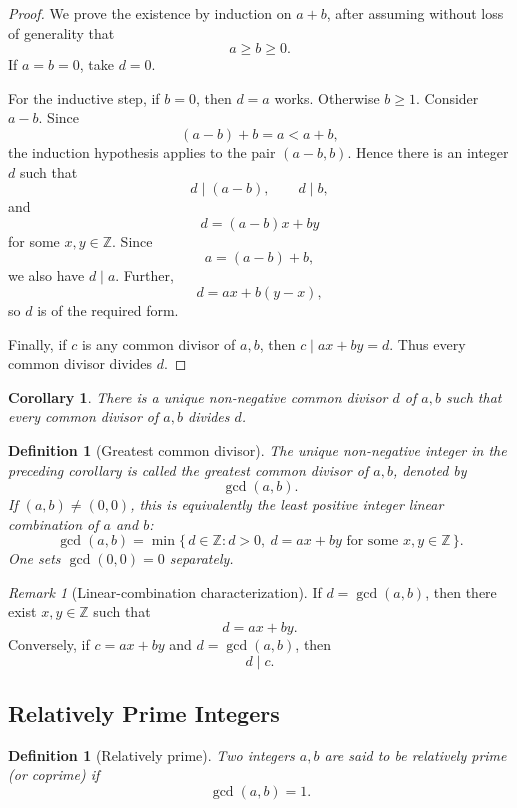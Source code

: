 \documentclass[11pt]{article}
\newtheorem{corollary}[theorem]{Corollary}
\newtheorem{definition}[theorem]{Definition}
\theoremstyle{remark}
\newtheorem*{remark}{Remark}
\DeclareMathOperator{\gcdop}{gcd}
\newcommand{\Z}{\mathbb Z}
\begin{document}
\begin{proof}
We prove the existence by induction on $a+b$, after assuming without loss
of generality that
\[
    a\ge b\ge 0.
\]
If $a=b=0$, take $d=0$.

For the inductive step, if $b=0$, then $d=a$ works. Otherwise $b\ge1$.
Consider $a-b$. Since
\[
    (a-b)+b=a<a+b,
\]
the induction hypothesis applies to the pair $(a-b,b)$. Hence there is an
integer $d$ such that
\[
    d\mid(a-b),\qquad d\mid b,
\]
and
\[
    d=(a-b)x+by
\]
for some $x,y\in\Z$. Since
\[
    a=(a-b)+b,
\]
we also have $d\mid a$. Further,
\[
    d=ax+b(y-x),
\]
so $d$ is of the required form.

Finally, if $c$ is any common divisor of $a,b$, then
$c\mid ax+by=d$. Thus every common divisor divides $d$.
\end{proof}

\begin{corollary}
There is a unique non-negative common divisor $d$ of $a,b$ such that every
common divisor of $a,b$ divides $d$.
\end{corollary}

\begin{definition}[Greatest common divisor]
The unique non-negative integer in the preceding corollary is called the
\emph{greatest common divisor} of $a,b$, denoted by
\[
    \gcdop(a,b).
\]
If $(a,b)\neq(0,0)$, this is equivalently the least positive integer linear
combination of $a$ and $b$:
\[
    \gcdop(a,b)
    =
    \min\{\,d\in\Z : d>0,\ d=ax+by\text{ for some }x,y\in\Z\,\}.
\]
One sets $\gcdop(0,0)=0$ separately.
\end{definition}

\begin{remark}[Linear-combination characterization]
If $d=\gcdop(a,b)$, then there exist $x,y\in\Z$ such that
\[
    d=ax+by.
\]
Conversely, if $c=ax+by$ and $d=\gcdop(a,b)$, then
\[
    d\mid c.
\]
\end{remark}

\subsection{Relatively Prime Integers}

\begin{definition}[Relatively prime]
Two integers $a,b$ are said to be \emph{relatively prime} (or coprime) if
\[
    \gcdop(a,b)=1.
\]
\end{definition}

\end{document}
